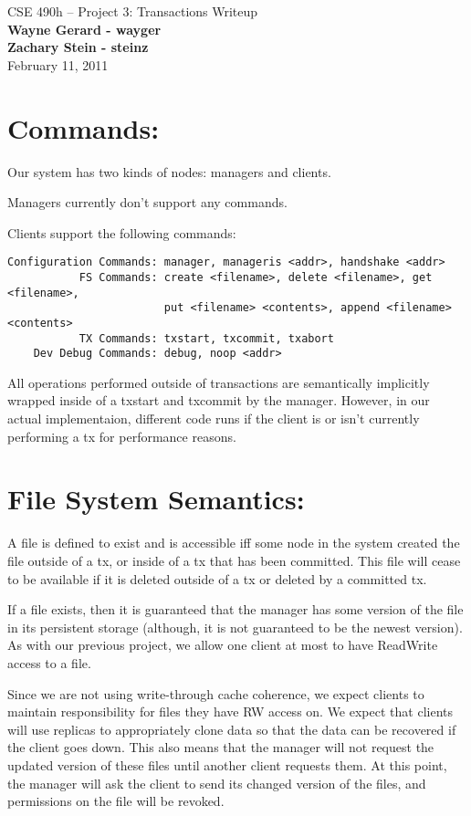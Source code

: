 \documentclass[11pt]{article}
\begin{document}
\begin{center}
{\large CSE 490h -- Project 3: Transactions Writeup} \\
\textbf{Wayne Gerard - wayger} \\
\textbf{Zachary Stein - steinz} \\
February 11, 2011
\end{center}

\section{Commands:} 

Our system has two kinds of nodes: managers and clients.

Managers currently don't support any commands.

Clients support the following commands:
\begin{verbatim}
Configuration Commands: manager, manageris <addr>, handshake <addr>
           FS Commands: create <filename>, delete <filename>, get <filename>, 
                        put <filename> <contents>, append <filename> <contents>
           TX Commands: txstart, txcommit, txabort
    Dev Debug Commands: debug, noop <addr>
\end{verbatim}

All operations performed outside of transactions are semantically implicitly wrapped inside of a txstart and txcommit by the manager. However, in our actual implementaion, different code runs if the client is or isn't currently performing a tx for performance reasons. 

\section{File System Semantics:} 

A file is defined to exist and is accessible iff some node in the system created the file outside of a tx, or inside of a tx that has been committed. 
This file will cease to be available if it is deleted outside of a tx or deleted by a committed tx.

If a file exists, then it is guaranteed that the manager has some version of the file in its persistent storage (although, it is not guaranteed to be the newest version). 
As with our previous project, we allow one client at most to have ReadWrite access to a file. 

Since we are not using write-through cache coherence, we expect clients to maintain responsibility for files they have RW access on. 
We expect that clients will use replicas to appropriately clone data so that the data can be recovered if the client goes down. This
also means that the manager will not request the updated version of these files until another client requests them. At this point,
the manager will ask the client to send its changed version of the files, and permissions on the file will be revoked. 
\end{document}
